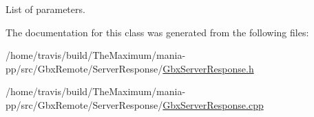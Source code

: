 List of parameters. 



The documentation for this class was generated from the following files\-:\begin{DoxyCompactItemize}
\item 
/home/travis/build/\-The\-Maximum/mania-\/pp/src/\-Gbx\-Remote/\-Server\-Response/\hyperlink{GbxServerResponse_8h}{Gbx\-Server\-Response.\-h}\item 
/home/travis/build/\-The\-Maximum/mania-\/pp/src/\-Gbx\-Remote/\-Server\-Response/\hyperlink{GbxServerResponse_8cpp}{Gbx\-Server\-Response.\-cpp}\end{DoxyCompactItemize}
